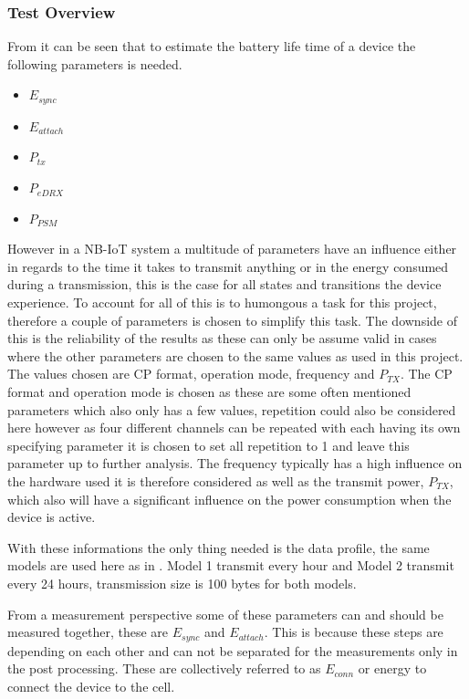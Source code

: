 \subsubsection{Test Overview}
From  it can be seen that to estimate the battery life time of a device the following parameters is needed.
\begin{itemize}
\item $E_{sync}$
\item $E_{attach}$
\item $P_{tx}$
\item $P_{eDRX}$
\item $P_{PSM}$
\end{itemize}

However in a \gls{NB-IoT} system a multitude of parameters have an influence either in regards to the time it takes to transmit anything or in the energy consumed during a transmission, this is the case for all states and transitions the device experience. To account for all of this is to humongous a task for this project, therefore a couple of parameters is chosen to simplify this task. The downside of this is the reliability of the results as these can only be assume valid in cases where the other parameters are chosen to the same values as used in this project. The values chosen are CP format, operation mode, frequency and $P_{TX}$. The CP format and operation mode is chosen as these are some often mentioned parameters which also only has a few values, repetition could also be considered here however as four different channels can be repeated with each having its own specifying parameter it is chosen to set all repetition to 1 and leave this parameter up to further analysis. The frequency typically has a high influence on the hardware used it is therefore considered as well as the transmit power, $P_{TX}$, which also will have a significant influence on the power consumption when the device is active.  

With these informations the only thing needed is the data profile, the same models are used here as in \citep{Power_article}. Model 1 transmit every hour and Model 2 transmit every 24 hours, transmission size is 100 bytes for both models. %

From a measurement perspective some of these parameters can and should be measured together, these are $E_{sync}$ and $E_{attach}$. This is because these steps are depending on each other and can not be separated for the measurements only in the post processing. These are collectively referred to as $E_{conn}$ or energy to connect the device to the cell. 

